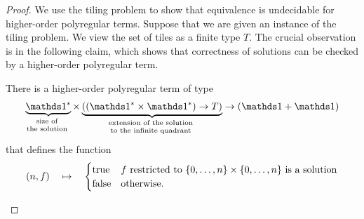 \begin{proof}
    We use the tiling problem to show that equivalence is undecidable for higher-order polyregular terms. Suppose that we are given an instance of the tiling problem. We view the set of tiles as a finite type $T$. The crucial observation is in the following claim, which shows that correctness of solutions can be checked by a higher-order polyregular term.
\begin{lemma}\label{lem:tiling-checker}
    There is a higher-order polyregular term  of type 
        \begin{align*}
\myunderbrace{\onetype^*}{size of \\ the solution} \times \myunderbrace{((\onetype^* \times \onetype^*) \to T)}{extension of the solution \\ to the infinite quadrant} \to (\onetype + \onetype)
\end{align*}
    that defines the function
    \begin{align*}
(n,f) \quad \mapsto \quad 
\begin{cases}
    \text{true} &\text{$f$ restricted to $\{0,\ldots,n\} \times \{0,\ldots,n\}$ is a solution} \\
    \text{false} & \text{otherwise}.
\end{cases}
\end{align*}
\end{lemma}


\end{proof}
